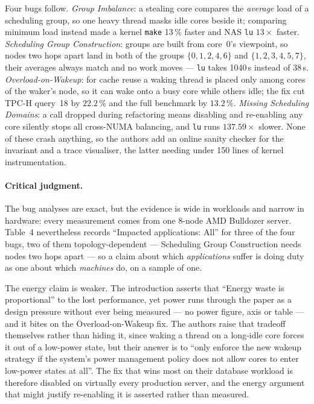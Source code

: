 Four bugs follow. \emph{Group Imbalance}: a stealing core compares the \emph{average}
load of a scheduling group, so one heavy thread masks idle cores beside it; comparing
minimum load instead made a kernel \texttt{make} 13\,\% faster and NAS \texttt{lu}
$13\times$ faster. \emph{Scheduling Group Construction}: groups are built from core~0's
viewpoint, so nodes two hops apart land in both of the groups $\{0,1,2,4,6\}$ and
$\{1,2,3,4,5,7\}$, their averages always match and no work moves --- \texttt{lu} takes
1040\,s instead of 38\,s. \emph{Overload-on-Wakeup}: for cache reuse a waking thread
is placed only among cores of the waker's node, so it can wake onto a busy core while
others idle; the fix cut TPC-H query~18 by $22.2\,\%$ and the full benchmark by
$13.2\,\%$. \emph{Missing Scheduling Domains}: a call dropped during refactoring means
disabling and re-enabling any core silently stops all cross-NUMA balancing, and
\texttt{lu} runs $137.59\times$ slower. None of these crash anything, so the authors add
an online sanity checker for the invariant and a trace visualiser, the latter needing
under 150 lines of kernel instrumentation.

\paragraph{Critical judgment.}
The bug analyses are exact, but the evidence is wide in workloads and narrow in
hardware: every measurement comes from one 8-node AMD Bulldozer server. Table~4
nevertheless records ``Impacted applications: All'' for three of the four bugs, two of
them topology-dependent --- Scheduling Group Construction needs nodes two hops apart ---
so a claim about which \emph{applications} suffer is doing duty as one about which
\emph{machines} do, on a sample of one.

The energy claim is weaker. The introduction asserts that ``Energy waste is
proportional'' to the lost performance, yet power runs through the paper as a design
pressure without ever being measured --- no power figure, axis or table --- and it bites
on the Overload-on-Wakeup fix. The authors raise that tradeoff themselves rather than
hiding it, since waking a thread on a long-idle core forces it out of a low-power state,
but
their answer is to ``only enforce the new wakeup strategy if the system's power
management policy does not allow cores to enter low-power states at all''. The fix that
wins most on their database workload is therefore disabled on virtually every production
server, and the energy argument that might justify re-enabling it is asserted rather
than measured.

